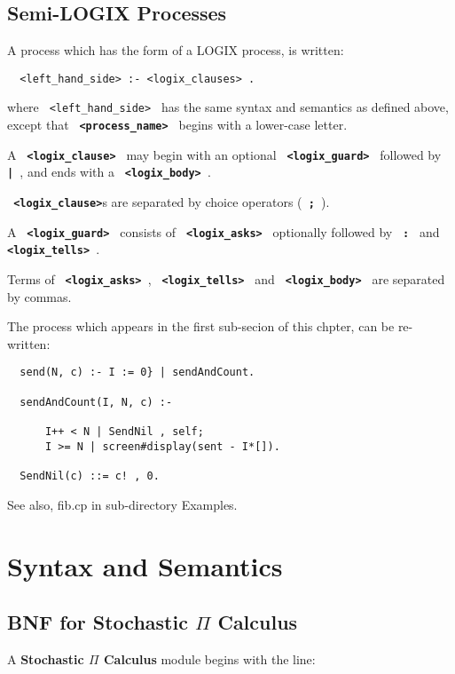 \documentclass[twoside,10pt]{report}
\begin{document}
\section{Semi-LOGIX Processes}

A process which has the form of a LOGIX process, is written:

\begin{verbatim}
  <left_hand_side> :- <logix_clauses> .
\end{verbatim}

\noindent
where \verb+ <left_hand_side> + has the same syntax and semantics as defined
above, except that {\bf \verb+ <process_name> +} begins with a lower-case
letter.
\newline

\noindent
A {\bf \verb+ <logix_clause> +} may begin with an optional
{\bf \verb+ <logix_guard> +} followed by {\bf \verb+ | +},
and ends with a {\bf \verb+ <logix_body> +}.
\newline

\noindent
{\bf \verb+ <logix_clause>+}s are separated by choice operators
({\bf \verb+ ; +}).  
\newline

\noindent
A {\bf \verb+ <logix_guard> +} consists of {\bf \verb+ <logix_asks> +}
optionally followed by {\bf \verb+ : +} and {\bf \verb+ <logix_tells> +}.
\newline

\noindent
Terms of {\bf \verb+ <logix_asks> +}, {\bf \verb+ <logix_tells> +} and
{\bf \verb+ <logix_body> +} are separated by commas.
\newline

The process which appears in the first sub-secion of this chpter, can be
re-written:

\begin{verbatim}
  send(N, c) :- I := 0} | sendAndCount.

  sendAndCount(I, N, c) :-

      I++ < N | SendNil , self;
      I >= N | screen#display(sent - I*[]).

  SendNil(c) ::= c! , 0.
\end{verbatim}

See also, fib.cp in sub-directory Examples.

\appendix
\chapter{Syntax and Semantics}
\section{BNF for Stochastic $\Pi$ Calculus}
\label{SPIBNF}
A {\bf Stochastic $\Pi$ Calculus} module begins with the line:
\end{document}
